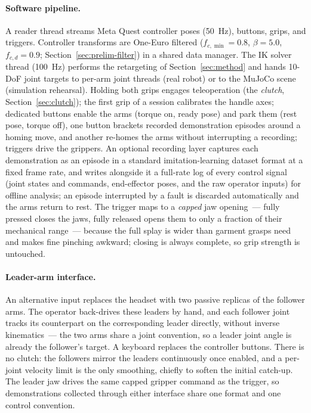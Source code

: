 \paragraph{Software pipeline.}
A reader thread streams Meta Quest controller poses (\SI{50}{Hz}),
buttons, grips, and triggers. Controller transforms are One-Euro
filtered (\(f_{c,\min}=0.8\), \(\beta=5.0\), \(f_{c,d}=0.9\);
Section~\ref{sec:prelim-filter}) in a shared data manager. The IK solver
thread (\SI{100}{Hz}) performs the retargeting of
Section~\ref{sec:method} and hands 10-DoF joint targets to per-arm joint
threads (real robot) or to the MuJoCo scene (simulation rehearsal).
Holding both grips engages teleoperation (the \emph{clutch},
Section~\ref{sec:clutch}); the first grip of a session calibrates the
handle axes; dedicated buttons enable the arms (torque on, ready pose)
and park them (rest pose, torque off), one button brackets recorded
demonstration episodes around a homing move, and another re-homes the
arms without interrupting a recording; triggers drive the grippers. An
optional recording layer captures each demonstration as an episode in a
standard imitation-learning dataset format at a fixed frame rate, and
writes alongside it a full-rate log of every control signal (joint
states and commands, end-effector poses, and the raw operator inputs)
for offline analysis; an episode interrupted by a fault is discarded
automatically and the arms return to rest. The trigger maps to a \emph{capped} jaw opening~---
fully pressed closes the jaws, fully released opens them to only a
fraction of their mechanical range~--- because the full splay is wider
than garment grasps need and makes fine pinching awkward; closing is
always complete, so grip strength is untouched.

\paragraph{Leader-arm interface.}
An alternative input replaces the headset with two passive replicas of
the follower arms. The operator back-drives these leaders by hand, and
each follower joint tracks its counterpart on the corresponding leader
directly, without inverse kinematics~--- the two arms share a joint
convention, so a leader joint angle is already the follower's target. A
keyboard replaces the controller buttons. There is no clutch: the
followers mirror the leaders continuously once enabled, and a per-joint
velocity limit is the only smoothing, chiefly to soften the initial
catch-up. The leader jaw drives the same capped gripper command as the
trigger, so demonstrations collected through either interface share one
format and one control convention.

